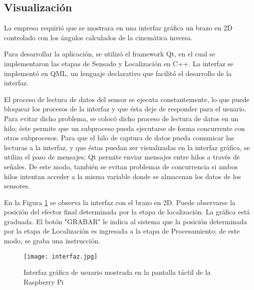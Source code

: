 \subsection{Visualización}

La empresa requirió que se mostrara en una interfaz gráfica un brazo en 2D controlado con los ángulos calculados de la cinemática inversa.

Para desarrollar la aplicación, se utilizó el framework Qt, en el cual se implementaron las etapas de Sensado y Localización en C++. La interfaz se implementó en QML, un lenguaje declarativo que facilitó el desarrollo de la interfaz.

El proceso de lectura de datos del sensor se ejecuta constantemente, lo que puede bloquear los procesos de la interfaz y que ésta deje de responder para el usuario. Para evitar dicho problema, se colocó dicho proceso de lectura de datos en un hilo; éste permite que un subproceso pueda ejecutarse de forma concurrente con otros subprocesos. Para que el hilo de captura de datos pueda comunicar las lecturas a la interfaz, y que éstas puedan ser visualizadas en la interfaz gráfica, se utiliza el paso de mensajes; Qt permite enviar mensajes entre hilos a través de señales. De este modo, también se evitan problemas de concurrencia si ambos hilos intentan acceder a la misma variable donde se almacenan los datos de los sensores.

En la Figura \ref{fig:interfaz} se observa la interfaz con el brazo en 2D. Puede observarse la posición del efector final determinada por la etapa de localización. La gráfica está graduada. El botón "GRABAR" le indica al sistema que la posición determinada por la etapa de Localización es ingresada a la etapa de Procesamiento; de este modo, se graba una instrucción.

\begin{figure}[htb]
	\centering
	\texttt{[image: interfaz.jpg]}
	\caption{Interfaz gráfica de usuario mostrada en la pantalla táctil de la Raspberry Pi}
	\label{fig:interfaz}
\end{figure}